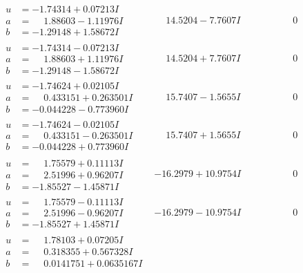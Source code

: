 \documentclass[1p]{elsarticle_modified}
\theoremstyle{definition}
\begin{document}
$$\begin{array}{c|c|c}
 \hline 
\begin{aligned}
u &= -1.74314 + 0.07213 I \\
a &= \phantom{-}1.88603 - 1.11976 I \\
b &= -1.29148 + 1.58672 I\end{aligned}
 & \phantom{-}14.5204 - 7.7607 I & \phantom{-0.000000 } 0 \\ \hline\begin{aligned}
u &= -1.74314 - 0.07213 I \\
a &= \phantom{-}1.88603 + 1.11976 I \\
b &= -1.29148 - 1.58672 I\end{aligned}
 & \phantom{-}14.5204 + 7.7607 I & \phantom{-0.000000 } 0 \\ \hline\begin{aligned}
u &= -1.74624 + 0.02105 I \\
a &= \phantom{-}0.433151 + 0.263501 I \\
b &= -0.044228 - 0.773960 I\end{aligned}
 & \phantom{-}15.7407 - 1.5655 I & \phantom{-0.000000 } 0 \\ \hline\begin{aligned}
u &= -1.74624 - 0.02105 I \\
a &= \phantom{-}0.433151 - 0.263501 I \\
b &= -0.044228 + 0.773960 I\end{aligned}
 & \phantom{-}15.7407 + 1.5655 I & \phantom{-0.000000 } 0 \\ \hline\begin{aligned}
u &= \phantom{-}1.75579 + 0.11113 I \\
a &= \phantom{-}2.51996 + 0.96207 I \\
b &= -1.85527 - 1.45871 I\end{aligned}
 & -16.2979 + 10.9754 I & \phantom{-0.000000 } 0 \\ \hline\begin{aligned}
u &= \phantom{-}1.75579 - 0.11113 I \\
a &= \phantom{-}2.51996 - 0.96207 I \\
b &= -1.85527 + 1.45871 I\end{aligned}
 & -16.2979 - 10.9754 I & \phantom{-0.000000 } 0 \\ \hline\begin{aligned}
u &= \phantom{-}1.78103 + 0.07205 I \\
a &= \phantom{-}0.318355 + 0.567328 I \\
b &= \phantom{-}0.0141751 + 0.0635167 I\end{aligned}

\end{array}$$
\end{document}
